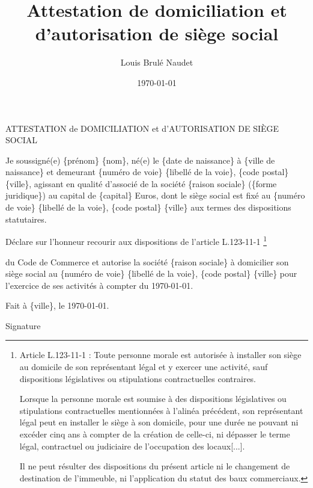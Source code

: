 \documentclass[french, 12pt]{report}
\title{Attestation de domiciliation et d'autorisation de siège social}
\author{Louis Brulé Naudet}
\date{\today}
\newcommand\blfootnote[1]{%
  \begingroup
  \renewcommand\thefootnote{}\footnote{#1}%
  \addtocounter{footnote}{-1}%
  \endgroup
}
\begin{document}
\begin{center}
\LARGE{ATTESTATION de DOMICILIATION et d'AUTORISATION DE SIÈGE SOCIAL}
\end{center}
\vspace{1cm}

Je soussigné(e) \{{prénom}\} \{{nom}\}, né(e) le \{{date de naissance}\} à \{{ville de naissance}\} et demeurant \{{numéro de voie}\} \{{libellé de la voie}\}, \{{code postal}\} \{{ville}\}, agissant en qualité d'associé de la société \{{raison sociale}\} (\{{forme juridique}\}) au capital de \{{capital}\} Euros, dont le siège social est fixé au \{{numéro de voie}\} \{{libellé de la voie}\}, \{{code postal}\} \{{ville}\} aux termes des dispositions statutaires.\par

	Déclare sur l'honneur recourir aux dispositions de l’article L.123-11-1\blfootnote{Article L.123-11-1 : \og Toute personne morale est autorisée à installer son siège au domicile de son représentant légal et y exercer une activité, sauf dispositions législatives ou stipulations contractuelles contraires.\vspace{1em}

Lorsque la personne morale est soumise à des dispositions législatives ou stipulations contractuelles mentionnées à l'alinéa précédent, son représentant légal peut en installer le siège à son domicile, pour une durée ne pouvant ni excéder cinq ans à compter de la création de celle-ci, ni dépasser le terme légal, contractuel ou judiciaire de l'occupation des locaux[...].\vspace{1em}

Il ne peut résulter des dispositions du présent article ni le changement de destination de l'immeuble, ni l'application du statut des baux commerciaux\fg{}.} du Code de Commerce et autorise la société \{{raison sociale}\} à domicilier son siège social au \{{numéro de voie}\} \{{libellé de la voie}\}, \{{code postal}\} \{{ville}\} pour l'exercice de ses activités à compter du {\today}.\par

Fait à \{{ville}\}, le {\today}.\par
\hspace*{8cm}Signature
\end{document}

